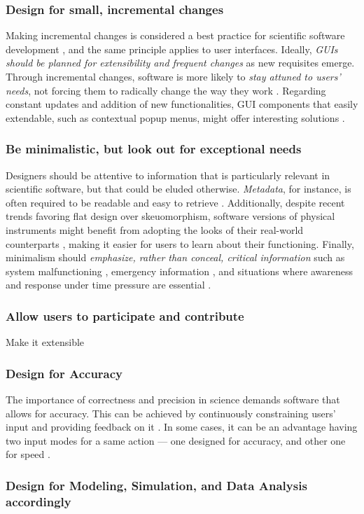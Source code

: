 \subsubsection{Design for small, incremental changes}
Making incremental changes is considered a best practice for scientific software development  \cite{bestprSC}, and the same principle applies to user interfaces. Ideally, \emph{GUIs should be planned for extensibility and frequent changes} as new requisites emerge. Through incremental changes, software is more likely to \emph{stay attuned to users' needs}, not forcing them to radically change the way they work \cite{DeRoure:2009}. Regarding constant updates and addition of new functionalities, GUI components that easily extendable, such as contextual popup menus, might offer interesting solutions \cite{MacLeod:1992}. 

\subsubsection{Be minimalistic, but look out for exceptional needs}

Designers should be attentive to information that is particularly relevant in scientific software, but that could be eluded otherwise. \emph{Metadata}, for instance, is often required to be readable and easy to retrieve  \cite{Talbott:2005, Baxter:2006, Macaulay:2009, Keefe:2010, DeMatos:2013, bestprSC, Thomer:2016}. Additionally, despite recent trends favoring flat design over skeuomorphism, software versions of physical instruments might benefit from adopting the looks of their real-world counterparts \cite{Foster:1998}, making it easier for users to learn about their functioning.  Finally, minimalism should \emph{emphasize, rather than conceal, critical information} such as system malfunctioning \cite{Morais:2014}, emergency information \cite{Ferguson:2016}, and situations where awareness and response under time pressure are essential \cite{Aragon:2008}.  


\subsubsection{Allow users to participate and contribute} Make it extensible

\subsubsection{Design for Accuracy}
The importance of correctness and precision  in  science demands software that allows for accuracy. This can be achieved by continuously constraining   users' input and  providing   feedback on it  \cite{Keefe:2010}. In some cases, it can be an advantage  having two input modes for a same action --- one designed for accuracy, and other one for speed \cite{MacLeod:1992}.    

\subsubsection{Design for Modeling, Simulation, and Data Analysis accordingly}

